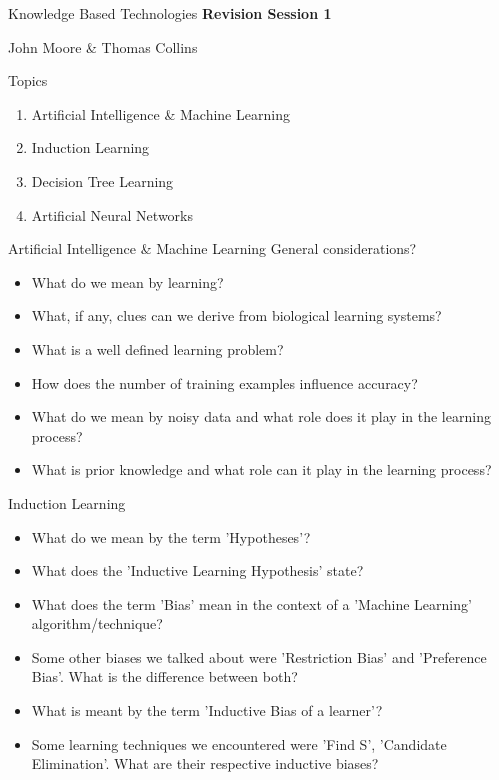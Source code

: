 \documentclass[%
pdf,
colorBG,
slideColor,
tcrico,
]{prosper}
\begin{document}
\begin{slide}{Knowledge Based Technologies}
	\textbf{Revision Session 1}

	\small
	John Moore \& Thomas Collins
\end{slide}

\begin{slide}{Topics} 

\begin{enumerate}
\item Artificial Intelligence \& Machine Learning
\item Induction Learning
\item Decision Tree Learning
\item Artificial Neural Networks
\end{enumerate}
\end{slide}

\begin{slide}{Artificial Intelligence \& Machine Learning} 
General considerations?
\begin{itemize}
\item What do we mean by learning?
\item What, if any, clues can we derive from biological learning systems?
\item What is a well defined learning problem?
\item How does the number of training examples influence accuracy?
\item What do we mean by noisy data and what role does it play in the learning process?
\item What is prior knowledge and what role can it play in the learning process?
\end{itemize}
\end{slide}


\begin{slide}{Induction Learning} 
\begin{itemize}
\item What do we mean by the term 'Hypotheses'?
\item What does the 'Inductive Learning Hypothesis' state?
\item What does the term 'Bias' mean in the context of a 'Machine Learning' algorithm/technique?
\item Some other biases we talked about were 'Restriction Bias' and 'Preference Bias'. What is the difference between both?
\item What is meant by the term 'Inductive Bias of a learner'?
\item Some learning techniques we encountered were 'Find S', 'Candidate Elimination'. What are their respective inductive biases?
\end{itemize}
\end{slide}
\end{document}
